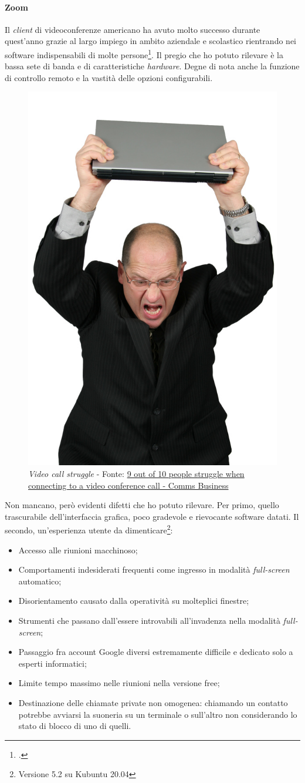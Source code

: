 \paragraph{Zoom} Il \textit{client} di videoconferenze americano ha avuto molto successo durante quest'anno grazie al largo impiego in ambito aziendale e scolastico rientrando nei software indispensabili di molte persone\footcite{site:zoomBlog}. Il pregio che ho potuto rilevare è la bassa sete di banda e di caratteristiche \textit{hardware}. Degne di nota anche la funzione di controllo remoto e la vastità delle opzioni configurabili.
\vspace{30pt}
\begin{figure}[H]
    \centering
    \includegraphics[width=0.35\columnwidth]{immagini/vc_struggle.jpg}
    \caption{\textit{Video call struggle} - Fonte: \href{https://www.commsbusiness.co.uk/news/9-out-of-10-people-struggle-when-connecting-to-a-video-conference-call/}{9 out of 10 people struggle when connecting to a video conference call - Comms Business}}
    \label{fig:vcStruggle}
\end{figure}
\newpage
Non mancano, però evidenti difetti che ho potuto rilevare. Per primo, quello trascurabile dell'interfaccia grafica, poco gradevole e rievocante software datati. Il secondo, un'esperienza utente da dimenticare\footnote{Versione 5.2 su Kubuntu 20.04}:
\begin{itemize}
    \item Accesso alle riunioni macchinoso;
    \item Comportamenti indesiderati frequenti come ingresso in modalità \textit{full-screen} automatico;
    \item Disorientamento causato dalla operatività su molteplici finestre;
    \item Strumenti che passano dall'essere introvabili all'invadenza nella modalità \textit{full-screen};
    \item Passaggio fra account Google diversi estremamente difficile e dedicato solo a esperti informatici;
    \item Limite tempo massimo nelle riunioni nella versione free;
    \item Destinazione delle chiamate private non omogenea: chiamando un contatto potrebbe avviarsi la suoneria su un terminale o sull'altro non considerando lo stato di blocco di uno di quelli.
\end{itemize}
